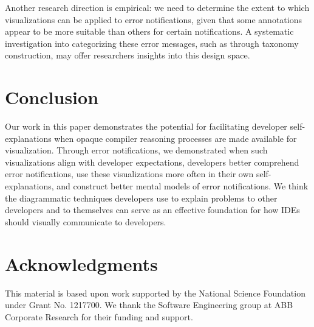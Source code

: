 \documentclass[conference]{IEEEtran}
\begin{document}
Another research direction is empirical: we need to determine the extent to which visualizations can be applied to error notifications, given that some annotations appear to be more suitable than others for certain notifications. A systematic investigation into categorizing these error messages, such as through taxonomy construction, may offer researchers insights into this design space.



\section{Conclusion}

Our work in this paper demonstrates the potential for facilitating developer self-explanations when opaque compiler reasoning processes are made available for visualization. Through error notifications, we demonstrated when such visualizations align with developer expectations, developers better comprehend error notifications, use these visualizations more often in their own self-explanations, and construct better mental models of error notifications. We think the diagrammatic techniques developers use to explain problems to other developers and to themselves can serve as an effective foundation for how IDEs should visually communicate to developers.

\section*{Acknowledgments}

This material is based upon work supported by the National Science Foundation under Grant No. 1217700. We thank the Software Engineering group at ABB Corporate Research for their funding and support.
\end{document}
